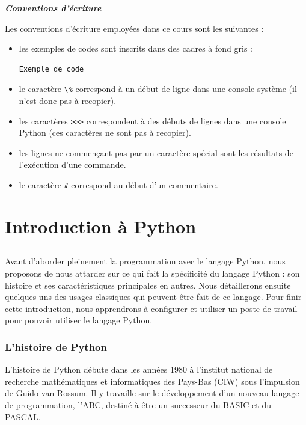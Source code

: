 \documentclass[12pt, a4paper]{article}
\begin{document}
\begin{footnotesize}
	\begin{minipage}{0.9\textwidth}
		\textbf{\textit{Conventions d'écriture}}
		
		Les conventions d'écriture employées dans ce cours sont les suivantes :
		
		\begin{itemize}
			\item les exemples de codes sont inscrits dans des cadres à fond gris : 
				\begin{lstlisting}
Exemple de code
				\end{lstlisting}

			\item le caractère \lstinline{\%} correspond à un début de ligne dans une console système (il n'est donc pas à recopier).
			\item les caractères \lstinline{>>>} correspondent à des débuts de lignes dans une console Python (ces caractères ne sont pas à recopier).
			\item les lignes ne commençant pas par un caractère spécial sont les résultats de l'exécution d'une commande.
			\item le caractère \lstinline{#} correspond au début d'un commentaire.
		\end{itemize}
	\end{minipage}
\end{footnotesize}




\newpage
\part{Introduction à Python}
\chapter{}
Avant d'aborder pleinement la programmation avec le langage Python, nous proposons de nous attarder sur ce qui fait la spécificité du langage Python : son histoire et ses caractéristiques principales en autres. Nous détaillerons ensuite quelques-uns des usages classiques qui peuvent être fait de ce langage. Pour finir cette introduction, nous apprendrons à configurer et utiliser un poste de travail pour pouvoir utiliser le langage Python.



\section{L'histoire de Python}
L'histoire de Python débute dans les années 1980 à l'institut national de recherche mathématiques et informatiques des Pays-Bas (CIW) sous l'impulsion de Guido van Rossum. Il y travaille sur le développement d'un nouveau langage de programmation, l'ABC, destiné à être un successeur du BASIC et du PASCAL. 
\end{document}
